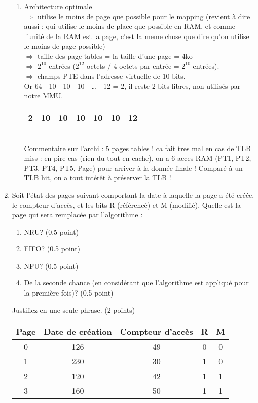 \begin{enumerate}
\begin{correction}
\begin{enumerate}[label=(\alph*)]
  \item Architecture optimale\\
        $\Rightarrow$ utilise le moins de page que possible pour le mapping (revient à dire aussi : qui utilise le moins de place que possible en RAM, et comme l’unité de la RAM est la page, c’est la meme chose que dire qu’on utilise le moins de page possible)\\
        $\Rightarrow$ taille des page tables = la taille d’une page = 4ko\\
        $\Rightarrow$ $2^{10}$ entrées ($2^{12}$ octets / 4 octets par entrée = $2^{10}$ entrées).\\
        $\Rightarrow$ champs PTE dans l'adresse virtuelle de 10 bits.\\
        Or 64 - 10 - 10 - 10 - … - 12 = 2, il reste 2 bits libres, non utilisés par notre MMU.\\
        \begin{tabular}{|c|c|c|c|c|c|c|}
           \hline 2 & 10 & 10 & 10 & 10 & 10 & 12\tabularnewline \hline
        \end{tabular}\\
         Commentaire sur l’archi : 5 pages tables ! ca fait tres mal en cas de
         TLB miss : en pire cas (rien du tout en cache), on a 6 acces RAM (PT1,
         PT2, PT3, PT4, PT5, Page) pour arriver à la donnée finale ! Comparé à
         un TLB hit, on a tout intérêt à préserver la TLB !
\end{enumerate}
\end{correction}

\item Soit l'état des pages suivant comportant la date à laquelle la page a été créée, le compteur d'accès, et les bits R (référencé) et M (modifié). Quelle est la page qui sera remplacée par l'algorithme :
\begin{enumerate}
  \item NRU? (0.5 point)
  \item FIFO? (0.5 point)
  \item NFU? (0.5 point)
  \item De la seconde chance (en considérant que l'algorithme est appliqué pour la première fois)? (0.5 point)
\end{enumerate}
Justifiez en une seule phrase. (2 points)

\begin{center}
\begin{tabular}{|c|c|c|c|c|}
\hline
Page & Date de création & Compteur d'accès & R & M\tabularnewline
\hline
\hline
0 & 126 & 49 & 0 & 0\tabularnewline
\hline
1 & 230 & 30 & 1 & 0\tabularnewline
\hline
2 & 120 & 42 & 1 & 1\tabularnewline
\hline
3 & 160 & 50 & 1 & 1\tabularnewline
\hline
\end{tabular}
\end{center}


\end{enumerate}
